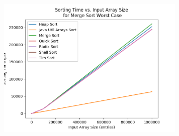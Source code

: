\begin{figure}[!htp]
\centering
\includegraphics[width=9cm]{figures/plots_without_BubbleSort_InsertionSort/sorting_time_vs_input_array_size_MergeSortWorstCase.png}
\end{figure}